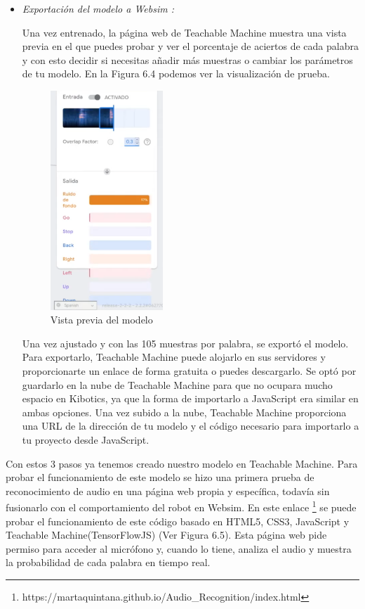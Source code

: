 \begin{itemize}
\item  \textit{Exportación del modelo a Websim :}

Una vez entrenado, la página web de Teachable Machine muestra una vista previa en el que puedes probar y ver el porcentaje de aciertos de cada palabra y con esto decidir si necesitas añadir más muestras o cambiar los parámetros de tu modelo.  En la Figura 6.4 podemos ver la visualización de prueba.

\begin{figure}[H]
 \centering
    \includegraphics[width=0.4\textwidth, height=0.6\textwidth]{chapters/images/teachablemachine2.png}
    \caption{Vista previa del modelo}
\end{figure}
 

Una vez ajustado y con las 105 muestras por palabra, se exportó el modelo. 
Para exportarlo, Teachable Machine puede alojarlo en sus servidores y proporcionarte  un enlace de forma gratuita o puedes descargarlo. Se optó por guardarlo en la nube de Teachable Machine para que no ocupara mucho espacio en Kibotics, ya que la forma de importarlo  a JavaScript era similar en ambas opciones.
Una vez subido a la nube, Teachable Machine proporciona una URL de la dirección de tu modelo y el código necesario para importarlo a tu proyecto desde JavaScript.
\end{itemize}

Con estos 3 pasos ya tenemos creado nuestro modelo en Teachable Machine. Para probar el funcionamiento de este modelo se hizo una  primera prueba de reconocimiento de audio en una página web propia y específica, todavía sin fusionarlo con el comportamiento del robot en Websim. En este enlace \footnote{https://martaquintana.github.io/Audio\_Recognition/index.html} se puede probar el funcionamiento de este código basado en HTML5, CSS3, JavaScript y Teachable Machine(TensorFlowJS) (Ver Figura 6.5). Esta página web pide permiso para acceder al micrófono y, cuando lo tiene, analiza el audio  y muestra la probabilidad de cada palabra en tiempo real.  

